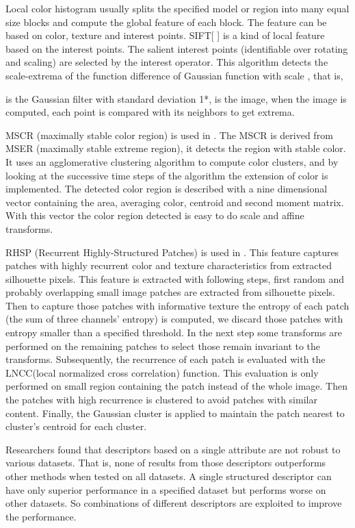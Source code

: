 Local color histogram usually splits the specified model or region into many equal size blocks and compute the global feature of each block. The feature can be based on color, texture and interest points. SIFT[ ] is a kind of local feature based on the interest points. The salient interest points (identifiable over rotating and scaling) are selected by the interest operator. This algorithm detects the scale-extrema of the function difference of Gaussian function with scale , that is, 

 is the Gaussian filter with standard deviation 1*,  is the image, when the  image is computed, each point  is compared with its neighbors to get  extrema.

MSCR (maximally stable color region) is used in \cite{SDALF}. The MSCR is derived from MSER (maximally stable extreme region), it detects the region with stable color. It uses an agglomerative clustering algorithm to compute color clusters, and by looking at the successive time steps of the algorithm the extension of color is implemented. The detected color region is described with a nine dimensional vector containing the area, averaging color, centroid and second moment matrix. With this vector the color region detected is easy to do scale and affine transforms.

RHSP (Recurrent Highly-Structured Patches) is used in \cite{SDALF}. This feature captures patches with highly recurrent color and texture characteristics from extracted silhouette pixels. This feature is extracted with following steps, first random and probably overlapping small image patches are extracted from silhouette pixels. Then to capture those patches with informative texture the entropy of each patch (the sum of three channels' entropy) is computed, we discard those patches with entropy smaller than a specified threshold. In the next step some transforms are performed on the remaining patches to select those remain invariant to the transforms. Subsequently, the recurrence of each patch is evaluated with the LNCC(local normalized cross correlation) function. This evaluation is only performed on small region containing the patch instead of the whole image. Then the patches with high recurrence is clustered to avoid patches with similar content. Finally, the Gaussian cluster is applied to maintain the patch nearest to cluster's centroid for each cluster.
 
Researchers found that descriptors based on a single attribute are not robust to various datasets. That is, none of results from those descriptors outperforms other methods when tested on all datasets. A single structured descriptor can have only superior performance in a specified dataset but performs worse on other datasets. So combinations of different descriptors are exploited to improve the performance. 

